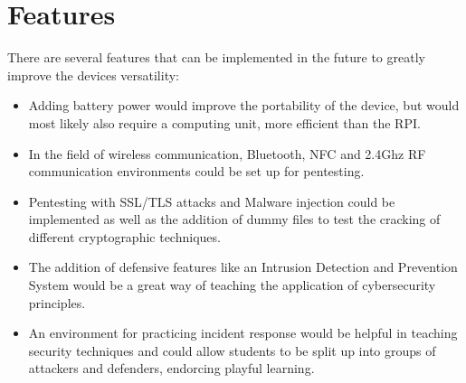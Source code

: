 \section{Features}
There are several features that can be implemented in the future to greatly improve the devices versatility:
\begin{itemize}
    \item Adding battery power would improve the portability of the device, but would most likely also require a computing unit, more efficient than the RPI.
    \item In the field of wireless communication, Bluetooth, NFC and 2.4Ghz RF communication environments could be set up for pentesting.
    \item Pentesting with SSL/TLS attacks and Malware injection could be implemented as well as the addition of dummy files to test the cracking of different cryptographic techniques.
    \item The addition of defensive features like an Intrusion Detection and Prevention System would be a great way of teaching the application of cybersecurity principles.
    \item An environment for practicing incident response would be helpful in teaching security techniques and could allow students to be split up into groups of attackers and defenders, endorcing playful learning.
\end{itemize}
